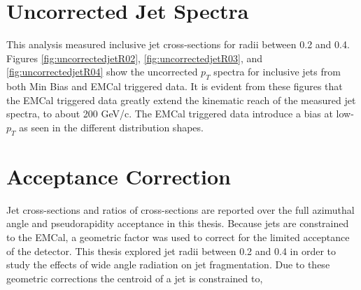 \section{Uncorrected Jet Spectra}

This analysis measured inclusive jet cross-sections for radii between 0.2 and 0.4.  Figures \ref{fig:uncorrectedjetR02}, \ref{fig:uncorrectedjetR03}, and \ref{fig:uncorrectedjetR04} show the uncorrected $p_{T}$ spectra for inclusive jets from both Min Bias and EMCal triggered data.  It is evident from these figures that the EMCal triggered data greatly extend the kinematic reach of the measured jet spectra, to about 200 GeV/c.  The EMCal triggered data introduce a bias at low-$p_{T}$ as seen in the different distribution shapes. 



\section{Acceptance Correction}
Jet cross-sections and ratios of cross-sections are reported over the full azimuthal angle and pseudorapidity acceptance in this thesis.  Because jets are constrained to the EMCal, a geometric factor was used to correct for the limited acceptance of the detector.  This thesis explored jet radii between 0.2 and 0.4 in order to study the effects of wide angle radiation on jet fragmentation.  Due to these geometric corrections the centroid of a jet is constrained to,

